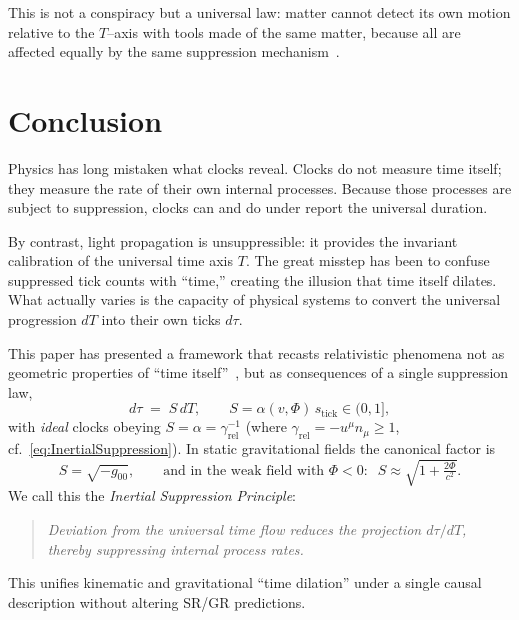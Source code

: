 \documentclass[12pt]{article}
\theoremstyle{plain} %
\begin{document}
\noindent
This is not a conspiracy but a universal law: matter cannot detect its own motion relative to the $T$–axis with tools made of the same matter, because all are affected equally by the same suppression mechanism~\cite{HafeleKeating1972a,HafeleKeating1972b}.


\section*{Conclusion}

Physics has long mistaken what clocks reveal. Clocks do not measure time itself; they measure the rate of their own internal processes. Because those processes are subject to suppression, clocks can and do under report the universal duration.

\medskip
\noindent
By contrast, light propagation is unsuppressible: it provides the invariant calibration of the universal time axis $T$. The great misstep has been to confuse suppressed tick counts with “time,” creating the illusion that time itself dilates. What actually varies is the capacity of physical systems to convert the universal progression $dT$ into their own ticks $d\tau$.

\medskip
\noindent
This paper has presented a framework that recasts relativistic phenomena not as geometric properties of “time itself”~\cite{Einstein1905,Minkowski1908}, but as consequences of a single suppression law,
\begin{equation}
d\tau \;=\; S\,dT,\qquad S=\alpha(v,\Phi)\,s_{\mathrm{tick}}\in(0,1],
\label{eq:ConclusionSuppression}
\end{equation}
with \emph{ideal} clocks obeying $S=\alpha=\gamma_{\mathrm{rel}}^{-1}$ (where $\gamma_{\mathrm{rel}}=-u^\mu n_\mu\ge1$, cf.~\eqref{eq:InertialSuppression}). In static gravitational fields the canonical factor is
\begin{equation}
S=\sqrt{-g_{00}},\qquad\text{and in the weak field with }\Phi<0:\;\; S\approx\sqrt{1+\tfrac{2\Phi}{c^2}}.
\label{eq:ConclusionGR}
\end{equation}
We call this the \emph{Inertial Suppression Principle}:
\begin{quote}
\textit{Deviation from the universal time flow reduces the projection $d\tau/dT$, thereby suppressing internal process rates.}
\end{quote}
This unifies kinematic and gravitational “time dilation” under a single causal description without altering SR/GR predictions.
\end{document}
